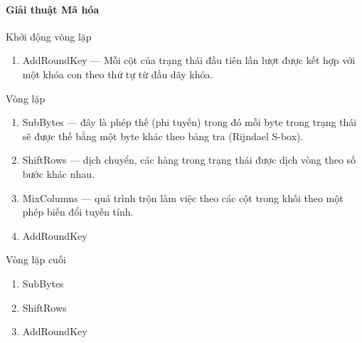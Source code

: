\documentclass[paper=a4, fontsize=11pt]{scrartcl}	%
\numberwithin{equation}{section}															%
\numberwithin{figure}{section}																%
\numberwithin{table}{section}																%
\begin{document}
	\paragraph{Giải thuật Mã hóa}
	\begin{description}
	\item Khởi động vòng lặp
		\begin{enumerate}
			\item AddRoundKey — Mỗi cột của trạng thái đầu tiên lần lượt được kết hợp với một khóa con theo thứ tự từ đầu dãy khóa.
		\end{enumerate}
	\item Vòng lặp
		\begin{enumerate}
			\item SubBytes — đây là phép thế (phi tuyến) trong đó mỗi byte trong trạng thái sẽ được thế bằng một byte khác theo bảng tra (Rijndael S-box).
			\item ShiftRows — dịch chuyển, các hàng trong trạng thái được dịch vòng theo số bước khác nhau.
			\item MixColumns — quá trình trộn làm việc theo các cột trong khối theo một phép biến đổi tuyến tính.
			\item AddRoundKey
		\end{enumerate}
	\item Vòng lặp cuối
		\begin{enumerate}
			\item SubBytes
			\item ShiftRows
			\item AddRoundKey
		\end{enumerate}
	\end{description}
\end{document}
